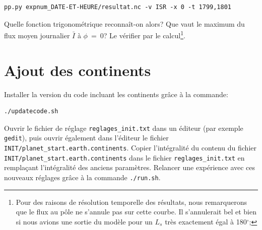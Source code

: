 \documentclass[a4paper,12pt]{article}
\begin{document}
\begin{enumerate}
\begin{enumerate}
\begin{verbatim}
pp.py expnum_DATE-ET-HEURE/resultat.nc -v ISR -x 0 -t 1799,1801
\end{verbatim}

Quelle fonction trigonométrique reconnaît-on alors? Que vaut le maximum du flux
moyen journalier $\bar{I}$ à $\phi$~=~0? Le vérifier par le calcul\footnote
{Pour des raisons de résolution temporelle des résultats, nous remarquerons que
le flux au pôle ne s'annule pas sur cette courbe. Il s'annulerait bel et bien
si nous avions une sortie du modèle pour un $L_s$ très exactement égal à
180$^\circ$;}.
\end{enumerate}

\end{enumerate}

\section{Ajout des continents}
\label{sct-continents}

Installer la version du code incluant les continents grâce à la commande:

\begin{verbatim}
./updatecode.sh
\end{verbatim}

Ouvrir le fichier de réglage \texttt{reglages\_init.txt} dans un éditeur (par
exemple \texttt{gedit}), puis ouvrir également dans l'éditeur le fichier
\texttt{INIT/planet\_start.earth.continents}.
Copier l'intégralité du contenu du fichier
\texttt{INIT/planet\_start.earth.continents} dans le fichier \texttt
{reglages\_init.txt} en remplaçant l'in\-tégralité des anciens paramètres.
Relancer une expérience avec ces nouveaux réglages grâce à la commande \texttt
{./run.sh}.
\end{document}
